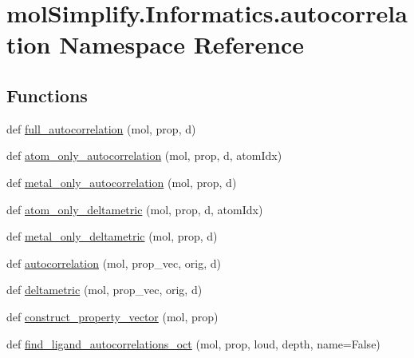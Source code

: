 \hypertarget{namespacemolSimplify_1_1Informatics_1_1autocorrelation}{}\section{mol\+Simplify.\+Informatics.\+autocorrelation Namespace Reference}
\label{namespacemolSimplify_1_1Informatics_1_1autocorrelation}
\subsection*{Functions}
\begin{DoxyCompactItemize}
\item 
def \hyperlink{namespacemolSimplify_1_1Informatics_1_1autocorrelation_a1dd2acfd794b1c0cba8c16567b39552d}{full\+\_\+autocorrelation} (mol, prop, d)
\item 
def \hyperlink{namespacemolSimplify_1_1Informatics_1_1autocorrelation_a5ea5cd28c3e45f0b72144b31e0e2a4bd}{atom\+\_\+only\+\_\+autocorrelation} (mol, prop, d, atom\+Idx)
\item 
def \hyperlink{namespacemolSimplify_1_1Informatics_1_1autocorrelation_a00dcb307fecc150201228d5f2792d197}{metal\+\_\+only\+\_\+autocorrelation} (mol, prop, d)
\item 
def \hyperlink{namespacemolSimplify_1_1Informatics_1_1autocorrelation_a1af29e5cfc5ea6beff64c1b69c42feb2}{atom\+\_\+only\+\_\+deltametric} (mol, prop, d, atom\+Idx)
\item 
def \hyperlink{namespacemolSimplify_1_1Informatics_1_1autocorrelation_a1ccea3bccb1bd9899e511bc271891170}{metal\+\_\+only\+\_\+deltametric} (mol, prop, d)
\item 
def \hyperlink{namespacemolSimplify_1_1Informatics_1_1autocorrelation_a64cd403978dc5121eedea0ecc39eb47c}{autocorrelation} (mol, prop\+\_\+vec, orig, d)
\item 
def \hyperlink{namespacemolSimplify_1_1Informatics_1_1autocorrelation_a4ea8024a494f24167169a734fc29987b}{deltametric} (mol, prop\+\_\+vec, orig, d)
\item 
def \hyperlink{namespacemolSimplify_1_1Informatics_1_1autocorrelation_a07f95df8800e6bc8c42c7f70497caa1b}{construct\+\_\+property\+\_\+vector} (mol, prop)
\item 
def \hyperlink{namespacemolSimplify_1_1Informatics_1_1autocorrelation_a4f518bc9b803f94507f31f1512773a35}{find\+\_\+ligand\+\_\+autocorrelations\+\_\+oct} (mol, prop, loud, depth, name=False)
\item 

\end{DoxyCompactItemize}
